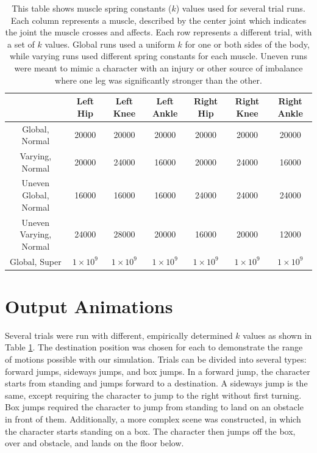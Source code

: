 \begin{table}[ht]
	\centering
	\scriptsize
	\begin{tabular}{| c | c | c | c | c | c | c |}
		\hline
		& Left Hip & Left Knee & Left Ankle & Right Hip & Right Knee & Right Ankle \\ \hline
		Global, Normal & 20000 & 20000 & 20000 & 20000 & 20000 & 20000 \\ \hline
		Varying, Normal & 20000 & 24000 & 16000 & 20000 & 24000 & 16000 \\ \hline
		Uneven Global, Normal & 16000 & 16000 & 16000 & 24000 & 24000 & 24000 \\ \hline
		Uneven Varying, Normal & 24000 & 28000 & 20000 & 16000 & 20000 & 12000 \\ \hline
		Global, Super & $1 \times 10^9$ & $1 \times 10^9$ & $1 \times 10^9$ & $1 \times 10^9$ & $1 \times 10^9$ & $1 \times 10^9$ \\ \hline
	\end{tabular}
	\caption[Table of spring constants for each trial]{This table shows muscle spring constants ($k$) values used for several trial runs.  Each column represents a muscle, described by the center joint which indicates the joint the muscle crosses and affects.  Each row represents a different trial, with a set of $k$ values.  Global runs used a uniform $k$ for one or both sides of the body, while varying runs used different spring constants for each muscle.  Uneven runs were meant to mimic a character with an injury or other source of imbalance where one leg was significantly stronger than the other.}
	\label{tab:run_k_vals}
\end{table}


\section{Output Animations}
\label{section:image_results}

Several trials were run with different, empirically determined $k$ values as shown in Table \ref{tab:run_k_vals}.  The destination position was chosen for each to demonstrate the range of motions possible with our simulation.  Trials can be divided into several types: forward jumps, sideways jumps, and box jumps.  In a forward jump, the character starts from standing and jumps forward to a destination.  A sideways jump is the same, except requiring the character to jump to the right without first turning.  Box jumps required the character to jump from standing to land on an obstacle in front of them.  Additionally, a more complex scene was constructed, in which the character starts standing on a box.  The character then jumps off the box, over and obstacle, and lands on the floor below.

